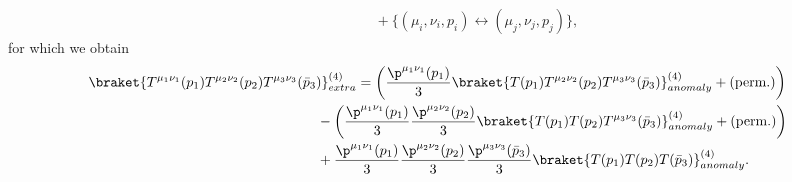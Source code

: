 \documentclass[a4paper,11pt,openright,twoside]{book}
\numberwithin{equation}{section}
\begin{document}
{{\begin{align}
	&\hspace{2cm}+\{(\mu_i,\nu_i,p_i)\leftrightarrow (\mu_j,\nu_j,p_j)\},
\end{align}
for which we obtain
\begin{align}
	\braket{T^{\mu_1\nu_1}(p_1)T^{\mu_2\nu_2}(p_2)T^{\mu_3\nu_3}(\bar{p}_3)}^{(4)}_{extra}&=\left(\frac{\p^{\mu_1\nu_1}(p_1)}{3}\braket{T(p_1)T^{\mu_2\nu_2}(p_2)T^{\mu_3\nu_3}(\bar{p}_3)}^{(4)}_{anomaly}+(\text{perm.})\right)\notag\\
	&\hspace{-1cm}-\left(\frac{\p^{\mu_1\nu_1}(p_1)}{3}\frac{\p^{\mu_2\nu_2}(p_2)}{3}\braket{T(p_1)T(p_2)T^{\mu_3\nu_3}(\bar{p}_3)}^{(4)}_{anomaly}+(\text{perm.})\right)\notag\\
	&\hspace{-1cm}+\frac{\p^{\mu_1\nu_1}(p_1)}{3}\frac{\p^{\mu_2\nu_2}(p_2)}{3}\frac{\p^{\mu_3\nu_3}(\bar{p}_3)}{3}\braket{T(p_1)T(p_2)T(\bar{p}_3)}^{(4)}_{anomaly}.
\end{align}
}}
\end{document}
